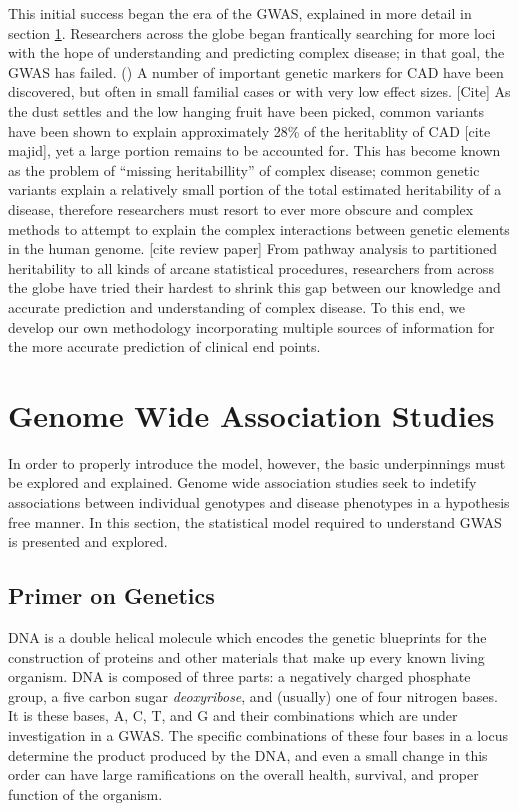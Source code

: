 This initial success began the era of the \ac{GWAS}, explained in more detail in section \ref{gwas}.  Researchers across the globe began frantically searching for more loci with the hope of understanding and predicting complex disease; in that goal, the \ac{GWAS} has failed. (\cite{Visscher2012}) A number of important genetic markers for \ac{CAD} have been discovered, but often in small familial cases or with very low effect sizes. [Cite] As the dust settles and the low hanging fruit have been picked, common variants have been shown to explain approximately 28\% of the heritablity of \ac{CAD} [cite majid], yet a large portion remains to be accounted for. This has become known as the problem of ``missing heritabillity'' of complex disease; common genetic variants explain a relatively small portion of the total estimated heritability of a disease, therefore researchers must resort to ever more obscure and complex methods to attempt to explain the complex interactions between genetic elements in the human genome. [cite review paper] From pathway analysis to partitioned heritability to all kinds of arcane statistical procedures, researchers from across the globe have tried their hardest to shrink this gap between our knowledge and accurate prediction and understanding of complex disease. To this end, we develop our own methodology incorporating multiple sources of information for the more accurate prediction of clinical end points. 

\section{Genome Wide Association Studies} \label{gwas}

In order to properly introduce the model, however, the basic underpinnings must be explored and explained. Genome wide association studies seek to indetify associations between individual genotypes and disease phenotypes in a hypothesis free manner. In this section, the statistical model required to understand \ac{GWAS} is presented and explored.

\subsection{Primer on Genetics}

\ac{DNA} is a double helical molecule which encodes the genetic blueprints for the construction of proteins and other materials that make up every known living organism. \ac{DNA} is composed of three parts: a negatively charged phosphate group, a five carbon sugar \textit{deoxyribose}, and (usually) one of four nitrogen bases. It is these bases, \ac{A}, \ac{C}, \ac{T}, and \ac{G} and their combinations which are under investigation in a \ac{GWAS}. The specific combinations of these four bases in a \ac{locus} determine the product produced by the \ac{DNA}, and even a small change in this order can have large ramifications on the overall health, survival, and proper function of the organism. 

